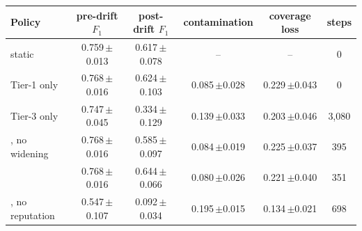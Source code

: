 \begin{tabular}{@{}lccccc@{}}
\toprule
Policy & pre-drift $F_1$ & post-drift $F_1$ & contamination & coverage loss & steps \\
\midrule
static & 0.759{\,\scriptsize$\pm$0.013} & 0.617{\,\scriptsize$\pm$0.078} & -- & -- & 0 \\
Tier-1 only & 0.768{\,\scriptsize$\pm$0.016} & 0.624{\,\scriptsize$\pm$0.103} & 0.085{\,\scriptsize$\pm$0.028} & 0.229{\,\scriptsize$\pm$0.043} & 0 \\
Tier-3 only & 0.747{\,\scriptsize$\pm$0.045} & 0.334{\,\scriptsize$\pm$0.129} & 0.139{\,\scriptsize$\pm$0.033} & 0.203{\,\scriptsize$\pm$0.046} & 3,080 \\
\drift{}, no widening & 0.768{\,\scriptsize$\pm$0.016} & 0.585{\,\scriptsize$\pm$0.097} & 0.084{\,\scriptsize$\pm$0.019} & 0.225{\,\scriptsize$\pm$0.037} & 395 \\
\drift{} & 0.768{\,\scriptsize$\pm$0.016} & 0.644{\,\scriptsize$\pm$0.066} & 0.080{\,\scriptsize$\pm$0.026} & 0.221{\,\scriptsize$\pm$0.040} & 351 \\
\drift{}, no reputation & 0.547{\,\scriptsize$\pm$0.107} & 0.092{\,\scriptsize$\pm$0.034} & 0.195{\,\scriptsize$\pm$0.015} & 0.134{\,\scriptsize$\pm$0.021} & 698 \\
\bottomrule
\end{tabular}